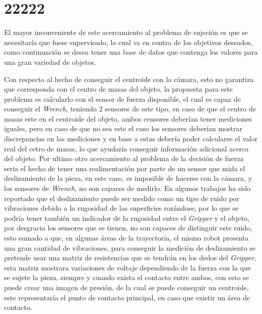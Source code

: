 \section{22222}

El mayor inconveniente de este acercamiento al problema de sujeción es que se necesitaría que fuese supervisado, lo cual va en contra de los objetivos deseados, como continuación se desea tener una base de datos que contenga los valores para una gran variedad de objetos.


Con respecto al hecho de conseguir el centroide con la cámara, esto no garantiza que corresponda con el centro de masas del objeto, la propuesta para este problema es calcularlo con el sensor de fuerza disponible, el cual es capaz de conseguir el \textit{Wrench}, teniendo 2 sensores de este tipo, en caso de que el centro de masas este en el centroide del objeto, ambos censores deberían tener mediciones iguales, pero en caso de que no sea este el caso los sensores deberían mostrar discrepancias en las mediciones y en base a estas debería poder calcularse el valor real del cetro de masas, lo que ayudaría conseguir información adicional acerca del objeto.
Por ultimo otro acercamiento al problema de la decisión de fuerza seria el hecho de tener una realimentación por parte de un sensor que mida el deslizamiento de la pieza, en este caso, es imposible de hacerse con la cámara, y los sensores de \textit{Wrench}, no son capaces de medirlo. En algunos trabajos ha sido reportado que el deslizamiento puede ser medido como un tipo de ruido por vibraciones debido a la rugosidad de las superficies rozándose, por lo que se podría tener también un indicador de la rugosidad entre el \textit{Gripper} y el objeto, por desgracia los sensores que se tienen, no son capaces de distinguir este ruido, esto sumado a que, en algunas áreas de la trayectoria, el mismo robot presenta una gran cantidad de vibraciones, para conseguir la medición de deslizamiento se pretende usar una matriz de resistencias que se tendrán en los dedos del \textit{Gripper}, esta matriz mostrara variaciones de voltaje dependiendo de la fuerza con la que se sujete la pieza, siempre y cuando exista el contacto entre ambos, con esto se puede crear una imagen de presión, de la cual se puede conseguir un centroide, este representaría el punto de contacto principal, en caso que existir un área de contacto. 
